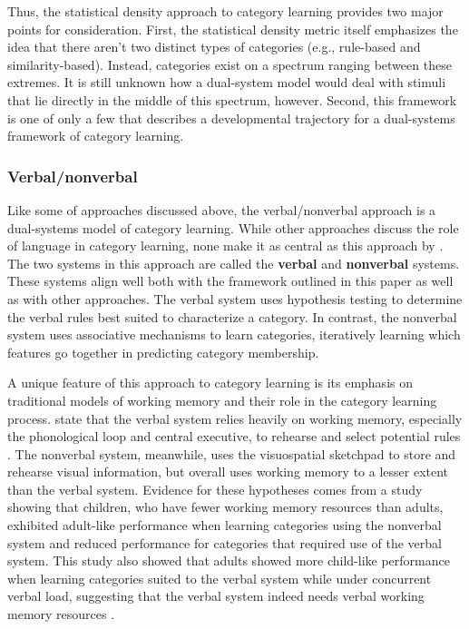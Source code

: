 \documentclass[../dissertation.tex]{subfiles}
\begin{document}
	Thus, the statistical density approach to category learning provides two major points for consideration. First, the statistical density metric itself emphasizes the idea that there aren't two distinct types of categories (e.g., rule-based and similarity-based). Instead, categories exist on a spectrum ranging between these extremes. It is still unknown how a dual-system model would deal with stimuli that lie directly in the middle of this spectrum, however. Second, this framework is one of only a few that describes a developmental trajectory for a dual-systems framework of category learning.
	
\subsubsection{Verbal/nonverbal}
	Like some of approaches discussed above, the verbal/nonverbal approach is a dual-systems model of category learning. While other approaches discuss the role of language in category learning, none make it as central as this approach by \citet{Minda2010}. The two systems in this approach are called the \textbf{verbal} and \textbf{nonverbal} systems. These systems align well both with the framework outlined in this paper as well as with other approaches. The verbal system uses hypothesis testing to determine the verbal rules best suited to characterize a category. In contrast, the nonverbal system uses associative mechanisms to learn categories, iteratively learning which features go together in predicting category membership. \par
	A unique feature of this approach to category learning is its emphasis on traditional models of working memory and their role in the category learning process. \citet{Minda2010} state that the verbal system relies heavily on working memory, especially the phonological loop and central executive, to rehearse and select potential rules \citep{Baddeley1974}. The nonverbal system, meanwhile, uses the visuospatial sketchpad to store and rehearse visual information, but overall uses working memory to a lesser extent than the verbal system. Evidence for these hypotheses comes from a study showing that children, who have fewer working memory resources than adults, exhibited adult-like performance when learning categories using the nonverbal system and reduced performance for categories that required use of the verbal system. This study also showed that adults showed more child-like performance when learning categories suited to the verbal system while under concurrent verbal load, suggesting that the verbal system indeed needs verbal working memory resources \citep{Minda2008}. \par
\end{document}
